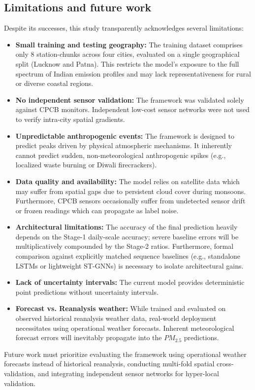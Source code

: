 \subsection{Limitations and future work}
Despite its successes, this study transparently acknowledges several limitations:
\begin{itemize}
    \item \textbf{Small training and testing geography:} The training dataset comprises only 8 station-chunks across four cities, evaluated on a single geographical split (Lucknow and Patna). This restricts the model's exposure to the full spectrum of Indian emission profiles and may lack representativeness for rural or diverse coastal regions.
    \item \textbf{No independent sensor validation:} The framework was validated solely against CPCB monitors. Independent low-cost sensor networks were not used to verify intra-city spatial gradients.
    \item \textbf{Unpredictable anthropogenic events:} The framework is designed to predict peaks driven by physical atmospheric mechanisms. It inherently cannot predict sudden, non-meteorological anthropogenic spikes (e.g., localized waste burning or Diwali firecrackers).
    \item \textbf{Data quality and availability:} The model relies on satellite data which may suffer from spatial gaps due to persistent cloud cover during monsoons. Furthermore, CPCB sensors occasionally suffer from undetected sensor drift or frozen readings which can propagate as label noise.
    \item \textbf{Architectural limitations:} The accuracy of the final prediction heavily depends on the Stage-1 daily-scale accuracy; severe baseline errors will be multiplicatively compounded by the Stage-2 ratios. Furthermore, formal comparison against explicitly matched sequence baselines (e.g., standalone LSTMs or lightweight ST-GNNs) is necessary to isolate architectural gains.
    \item \textbf{Lack of uncertainty intervals:} The current model provides deterministic point predictions without uncertainty intervals.
    \item \textbf{Forecast vs. Reanalysis weather:} While trained and evaluated on observed historical reanalysis weather data, real-world deployment necessitates using operational weather forecasts. Inherent meteorological forecast errors will inevitably propagate into the $PM_{2.5}$ predictions.
\end{itemize}

Future work must prioritize evaluating the framework using operational weather forecasts instead of historical reanalysis, conducting multi-fold spatial cross-validation, and integrating independent sensor networks for hyper-local validation.
